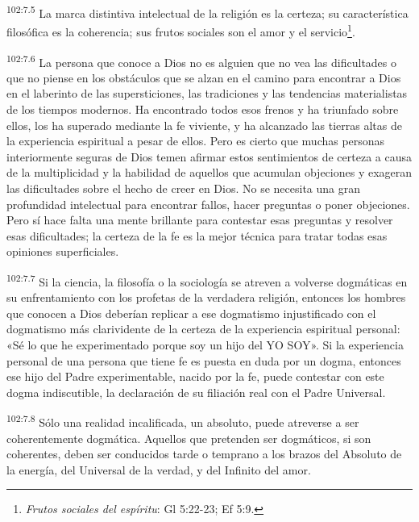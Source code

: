\par
\textsuperscript{102:7.5} La marca distintiva intelectual de la religión es la certeza; su característica filosófica es la coherencia; sus frutos sociales son el amor y el servicio\footnote{\textit{Frutos sociales del espíritu}: Gl 5:22-23; Ef 5:9.}.

\par
\textsuperscript{102:7.6} La persona que conoce a Dios no es alguien que no vea las dificultades o que no piense en los obstáculos que se alzan en el camino para encontrar a Dios en el laberinto de las supersticiones, las tradiciones y las tendencias materialistas de los tiempos modernos. Ha encontrado todos esos frenos y ha triunfado sobre ellos, los ha superado mediante la fe viviente, y ha alcanzado las tierras altas de la experiencia espiritual a pesar de ellos. Pero es cierto que muchas personas interiormente seguras de Dios temen afirmar estos sentimientos de certeza a causa de la multiplicidad y la habilidad de aquellos que acumulan objeciones y exageran las dificultades sobre el hecho de creer en Dios. No se necesita una gran profundidad intelectual para encontrar fallos, hacer preguntas o poner objeciones. Pero sí hace falta una mente brillante para contestar esas preguntas y resolver esas dificultades; la certeza de la fe es la mejor técnica para tratar todas esas opiniones superficiales.

\par
\textsuperscript{102:7.7} Si la ciencia, la filosofía o la sociología se atreven a volverse dogmáticas en su enfrentamiento con los profetas de la verdadera religión, entonces los hombres que conocen a Dios deberían replicar a ese dogmatismo injustificado con el dogmatismo más clarividente de la certeza de la experiencia espiritual personal: «Sé lo que he experimentado porque soy un hijo del YO SOY». Si la experiencia personal de una persona que tiene fe es puesta en duda por un dogma, entonces ese hijo del Padre experimentable, nacido por la fe, puede contestar con este dogma indiscutible, la declaración de su filiación real con el Padre Universal.

\par
\textsuperscript{102:7.8} Sólo una realidad incalificada, un absoluto, puede atreverse a ser coherentemente dogmática. Aquellos que pretenden ser dogmáticos, si son coherentes, deben ser conducidos tarde o temprano a los brazos del Absoluto de la energía, del Universal de la verdad, y del Infinito del amor.


